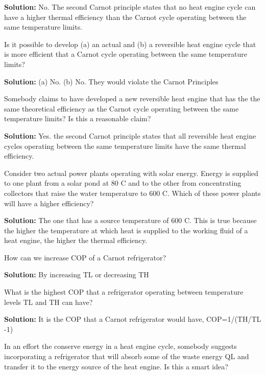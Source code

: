 \begin{list}{\bf Question :~}{}
       {\bf Solution:} No. The second Carnot principle states that no heat engine cycle can have a higher thermal efficiency than the Carnot cycle operating between the same temperature limits.

%
     \item\label{Q19} Is it possible to develop (a) an actual and (b) a reversible heat engine cycle that is more efficient that a Carnot cycle operating between the same temperature limits? 
%

       {\bf Solution:} (a) No. (b) No. They would violate the Carnot Principles

%
     \item\label{Q20} Somebody claims to have developed a new reversible heat engine that has the the same theoretical efficiency as the Carnot cycle operating between the same temperature limits? Is this a reasonable claim?
%

       {\bf Solution:} Yes. the second Carnot principle states that all reversible heat engine cycles operating between the same temperature limits have the same thermal efficiency.


%
     \item\label{Q21} Consider two actual power plants operating with solar energy. Energy is supplied to one plant from a solar pond at 80 C and to the other from concentrating collectors that raise the water temperature to 600 C. Which of these power plants will have a higher efficiency?
%

       {\bf Solution:} The one that has a source temperature of 600 C. This is true because the higher the temperature at which heat is supplied to the working fluid of a heat engine, the higher the thermal efficiency.

%
     \item\label{Q22} How can we increase COP of a Carnot refrigerator?
%

       {\bf Solution:} By increasing TL or decreasing TH

%
     \item\label{Q23} What is the highest COP that a refrigerator operating between temperature levels TL and TH can have?
%

       {\bf Solution:} It is the COP that a Carnot refrigerator would have, COP=1/(TH/TL -1)

%
     \item\label{Q24} In an effort the conserve energy in a heat engine cycle, somebody suggests incorporating a refrigerator that will absorb some of the waste energy QL and transfer it to the energy source of the heat engine. Is this a smart idea?
%


\end{list}
